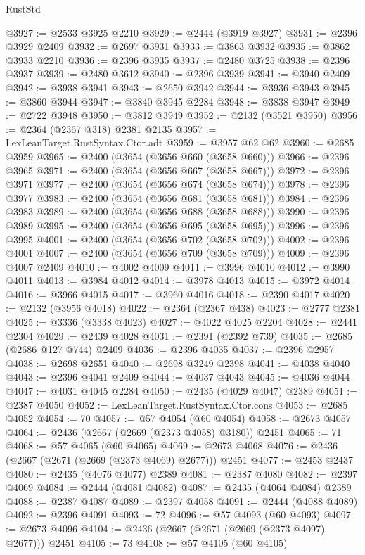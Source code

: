 \begin{lexlean}{RustStd}
\begin{coremodule}
@3927 := @2533 @3925 @2210
@3929 := @2444 (@3919 @3927)
@3931 := @2396 @3929 @2409
@3932 := @2697 @3931
@3933 := @3863 @3932
@3935 := @3862 @3933 @2210
@3936 := @2396 @3935
@3937 := @2480 @3725
@3938 := @2396 @3937
@3939 := @2480 @3612
@3940 := @2396 @3939
@3941 := @3940 @2409
@3942 := @3938 @3941
@3943 := @2650 @3942
@3944 := @3936 @3943
@3945 := @3860 @3944
@3947 := @3840 @3945 @2284
@3948 := @3838 @3947
@3949 := @2722 @3948
@3950 := @3812 @3949
@3952 := @2132 (@3521 @3950)
@3956 := @2364 (@2367 @318) @2381 @2135
@3957 := LexLeanTarget.RustSyntax.Ctor.adt
@3959 := @3957 @62 @62
@3960 := @2685 @3959
@3965 := @2400 (@3654 (@3656 @660 (@3658 @660)))
@3966 := @2396 @3965
@3971 := @2400 (@3654 (@3656 @667 (@3658 @667)))
@3972 := @2396 @3971
@3977 := @2400 (@3654 (@3656 @674 (@3658 @674)))
@3978 := @2396 @3977
@3983 := @2400 (@3654 (@3656 @681 (@3658 @681)))
@3984 := @2396 @3983
@3989 := @2400 (@3654 (@3656 @688 (@3658 @688)))
@3990 := @2396 @3989
@3995 := @2400 (@3654 (@3656 @695 (@3658 @695)))
@3996 := @2396 @3995
@4001 := @2400 (@3654 (@3656 @702 (@3658 @702)))
@4002 := @2396 @4001
@4007 := @2400 (@3654 (@3656 @709 (@3658 @709)))
@4009 := @2396 @4007 @2409
@4010 := @4002 @4009
@4011 := @3996 @4010
@4012 := @3990 @4011
@4013 := @3984 @4012
@4014 := @3978 @4013
@4015 := @3972 @4014
@4016 := @3966 @4015
@4017 := @3960 @4016
@4018 := @2390 @4017
@4020 := @2132 (@3956 @4018)
@4022 := @2364 (@2367 @438)
@4023 := @2777 @2381
@4025 := @3336 (@3338 @4023)
@4027 := @4022 @4025 @2204
@4028 := @2441 @2304
@4029 := @2439 @4028
@4031 := @2391 (@2392 @739)
@4035 := @2685 (@2686 @127 @744) @2409
@4036 := @2396 @4035
@4037 := @2396 @2957
@4038 := @2698 @2651
@4040 := @2698 @3249 @2398
@4041 := @4038 @4040
@4043 := @2396 @4041 @2409
@4044 := @4037 @4043
@4045 := @4036 @4044
@4047 := @4031 @4045 @2284
@4050 := @2435 (@4029 @4047) @2389
@4051 := @2387 @4050
@4052 := LexLeanTarget.RustSyntax.Ctor.cons
@4053 := @2685 @4052
@4054 := 70
@4057 := @57 @4054 (@60 @4054)
@4058 := @2673 @4057
@4064 := @2436 (@2667 (@2669 (@2373 @4058) @3180)) @2451
@4065 := 71
@4068 := @57 @4065 (@60 @4065)
@4069 := @2673 @4068
@4076 := @2436 (@2667 (@2671 (@2669 (@2373 @4069) @2677))) @2451
@4077 := @2453 @2437
@4080 := @2435 (@4076 @4077) @2389
@4081 := @2387 @4080
@4082 := @2397 @4069
@4084 := @2444 (@4081 @4082)
@4087 := @2435 (@4064 @4084) @2389
@4088 := @2387 @4087
@4089 := @2397 @4058
@4091 := @2444 (@4088 @4089)
@4092 := @2396 @4091
@4093 := 72
@4096 := @57 @4093 (@60 @4093)
@4097 := @2673 @4096
@4104 := @2436 (@2667 (@2671 (@2669 (@2373 @4097) @2677))) @2451
@4105 := 73
@4108 := @57 @4105 (@60 @4105)

\end{coremodule}
\end{lexlean}
